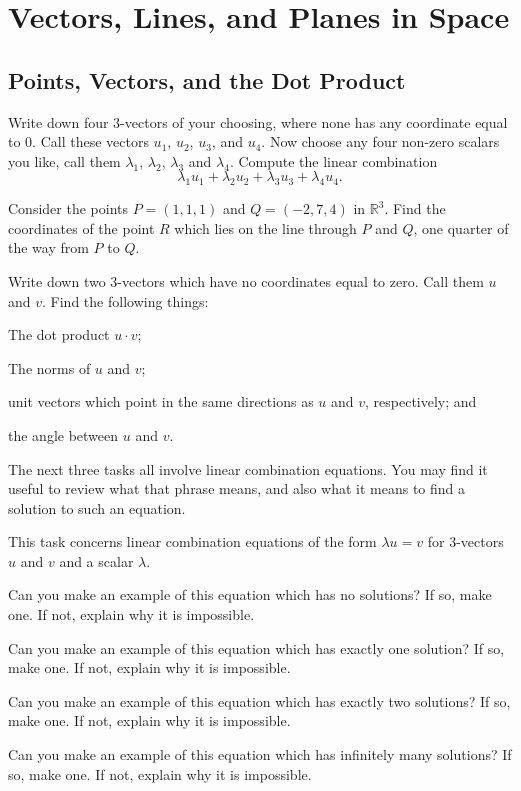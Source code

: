 \documentclass[cahier-main.tex]{subfiles}
\begin{document}
\chapter{Vectors, Lines, and Planes in Space}
\label{ch:two}

\section*{Points, Vectors, and the Dot Product}

\begin{task}
Write down four $3$-vectors of your choosing, where none has any coordinate equal to $0$. Call these vectors $u_1$, $u_2$, $u_3$, and $u_4$. Now choose any four non-zero scalars you like, call them $\lambda_1$, $\lambda_2$, $\lambda_3$ and $\lambda_4$. Compute the linear combination
\[
\lambda_1 u_1 + \lambda_2 u_2 + \lambda_3 u_3 + \lambda_4 u_4. 
\]
\end{task}

\begin{task}
Consider the points $P = (1,1,1)$ and $Q = (-2,7,4)$ in $\mathbb{R}^3$.
Find the coordinates of the point $R$ which lies on the line through $P$ and $Q$, one quarter of the way from $P$ to $Q$.
\end{task}

\begin{task}
Write down two $3$-vectors which have no coordinates equal to zero. Call them $u$ and $v$. Find the following things:
\begin{compactitem}
\item The dot product $u\cdot v$;
\item The norms of $u$ and $v$;
\item unit vectors which point in the same directions as $u$ and $v$, respectively; and
\item the angle between $u$ and $v$.
\end{compactitem}
\end{task}

The next three tasks all involve linear combination equations. You may find it useful to review what that phrase means, and also what it means to find a solution to such an equation.


\begin{task}
This task concerns linear combination equations of the form $\lambda u = v$ for $3$-vectors $u$ and $v$ and a scalar $\lambda$.
\begin{compactitem}
\item Can you make an example of this equation which has no solutions? If so, make one. If not, explain why it is impossible.
\item Can you make an example of this equation which has exactly one solution?  If so, make one. If not, explain why it is impossible.
\item Can you make an example of this equation which has exactly two solutions?  If so, make one. If not, explain why it is impossible.
\item Can you make an example of this equation which has infinitely many solutions? If so, make one. If not, explain why it is impossible.
\end{compactitem}
\end{task}
\end{document}
